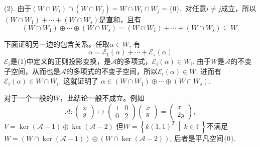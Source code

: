 {(2). 由于$(W\cap W_i) \cap (W\cap W_j) = W \cap W_i \cap W_j = \{0\},$ 对任意$i\neq j$成立，所以$(W \cap W_1) +\cdots+ (W \cap W_s)$是直和，且有
$$(W \cap W_1) \oplus\cdots\oplus (W \cap W_s) = (W \cap W_1) +\cdots+ (W \cap W_s) \subseteq W.$$

下面证明另一边的包含关系。任取$\alpha \in W$, 有
$$\alpha = \mathscr{E}_1(\alpha) + \cdots + \mathscr{E}_s(\alpha)$$
$\mathscr{E}_i$是(1)中定义的正则投影变换，是$\mathscr{A}$的多项式，$\mathscr{E}_i(\alpha) \in W_i$. 由于$W$是$\mathscr{A}$的不变子空间，从而也是$\mathscr{A}$的多项式的不变子空间，所以$\mathscr{E}_i(\alpha) \in W$, 进而有$\mathscr{E}_i(\alpha) \in W\cap W_i$. 这就证明了
$\alpha \in (W \cap W_1) \oplus\cdots\oplus (W \cap W_s)$.

对于一个一般的$W$，此结论一般不成立。例如
$$\mathscr{A}: \begin{pmatrix} x \\ y \end{pmatrix} \mapsto \begin{pmatrix} 1 & 0 \\ 0 & 2 \end{pmatrix} \begin{pmatrix} x \\ y \end{pmatrix} = \begin{pmatrix} x \\ 2y \end{pmatrix},$$
$V = \ker (\mathscr{A} - 1) \oplus \ker (\mathscr{A} - 2)$
但$W = \left\{ k(1,1)^T \ \middle|\ k\in\mathbb{F} \right\}$不满足
$W = (W \cap \ker (\mathscr{A} - 1)) \oplus (W \cap \ker (\mathscr{A} - 2))$, 后者是平凡空间$\{0\}$.


}
